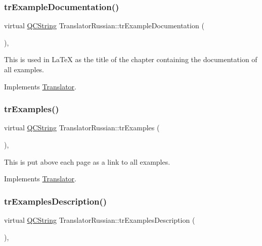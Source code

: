 \subsubsection{\texorpdfstring{trExampleDocumentation()}{trExampleDocumentation()}}
{\footnotesize\ttfamily virtual \mbox{\hyperlink{class_q_c_string}{Q\+C\+String}} Translator\+Russian\+::tr\+Example\+Documentation (\begin{DoxyParamCaption}{ }\end{DoxyParamCaption})\hspace{0.3cm}{\ttfamily [inline]}, {\ttfamily [virtual]}}

This is used in La\+TeX as the title of the chapter containing the documentation of all examples. 

Implements \mbox{\hyperlink{class_translator}{Translator}}.

\mbox{\label{class_translator_russian_a15e8b8460c400c4e7b80d36dd8b07864}} 
\subsubsection{\texorpdfstring{trExamples()}{trExamples()}}
{\footnotesize\ttfamily virtual \mbox{\hyperlink{class_q_c_string}{Q\+C\+String}} Translator\+Russian\+::tr\+Examples (\begin{DoxyParamCaption}{ }\end{DoxyParamCaption})\hspace{0.3cm}{\ttfamily [inline]}, {\ttfamily [virtual]}}

This is put above each page as a link to all examples. 

Implements \mbox{\hyperlink{class_translator}{Translator}}.

\mbox{\label{class_translator_russian_a0dde522a4e0b8fd6041fe54d3c15c6f1}} 
\subsubsection{\texorpdfstring{trExamplesDescription()}{trExamplesDescription()}}
{\footnotesize\ttfamily virtual \mbox{\hyperlink{class_q_c_string}{Q\+C\+String}} Translator\+Russian\+::tr\+Examples\+Description (\begin{DoxyParamCaption}{ }\end{DoxyParamCaption})\hspace{0.3cm}{\ttfamily [inline]}, {\ttfamily [virtual]}}

